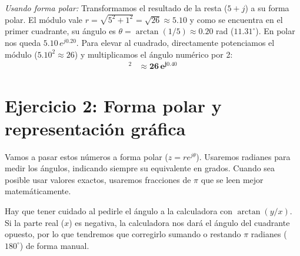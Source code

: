 \documentclass[10pt,a4paper]{article}
\begin{document}
\begin{enumerate}[label=\textbf{\alph*)}]
        \textit{Usando forma polar:} Transformamos el resultado de la resta ($5+j$) a su forma polar. El módulo vale $r = \sqrt{5^2+1^2} = \sqrt{26} \approx 5.10$ y como se encuentra en el primer cuadrante, su ángulo es $\theta = \arctan(1/5) \approx 0.20$ rad ($11.31^\circ$). En polar nos queda $5.10\, e^{j0.20}$.
        Para elevar al cuadrado, directamente potenciamos el módulo ($5.10^2 \approx 26$) y multiplicamos el ángulo numérico por 2:
        \begin{align*}
			[z_2 - z_3]^2 &\approx \mathbf{26\, e^{j0.40}}
		\end{align*}
	\end{enumerate}
	
	\section*{Ejercicio 2: Forma polar y representación gráfica}
	
	Vamos a pasar estos números a forma polar ($z = r e^{j\theta}$). Usaremos radianes para medir los ángulos, indicando siempre su equivalente en grados. Cuando sea posible usar valores exactos, usaremos fracciones de $\pi$ que se leen mejor matemáticamente.
    
    Hay que tener cuidado al pedirle el ángulo a la calculadora con $\arctan(y/x)$. Si la parte real ($x$) es negativa, la calculadora nos dará el ángulo del cuadrante opuesto, por lo que tendremos que corregirlo sumando o restando $\pi$ radianes ($180^\circ$) de forma manual.
	
\end{document}
